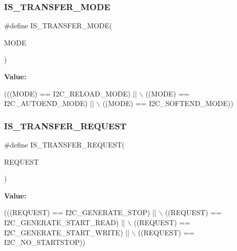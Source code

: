 \subsubsection{\texorpdfstring{I\+S\+\_\+\+T\+R\+A\+N\+S\+F\+E\+R\+\_\+\+M\+O\+DE}{IS\_TRANSFER\_MODE}}
{\footnotesize\ttfamily \#define I\+S\+\_\+\+T\+R\+A\+N\+S\+F\+E\+R\+\_\+\+M\+O\+DE(\begin{DoxyParamCaption}\item[{}]{M\+O\+DE }\end{DoxyParamCaption})}

{\bfseries Value\+:}
\begin{DoxyCode}
(((MODE) == I2C\_RELOAD\_MODE)   || \(\backslash\)
                                         ((MODE) == I2C\_AUTOEND\_MODE) || \(\backslash\)
                                         ((MODE) == I2C\_SOFTEND\_MODE))
\end{DoxyCode}
\mbox{\label{group___i2_c___private___macro_ga035522b30af949e6643a5c34bd07f9d2}} 
\subsubsection{\texorpdfstring{I\+S\+\_\+\+T\+R\+A\+N\+S\+F\+E\+R\+\_\+\+R\+E\+Q\+U\+E\+ST}{IS\_TRANSFER\_REQUEST}}
{\footnotesize\ttfamily \#define I\+S\+\_\+\+T\+R\+A\+N\+S\+F\+E\+R\+\_\+\+R\+E\+Q\+U\+E\+ST(\begin{DoxyParamCaption}\item[{}]{R\+E\+Q\+U\+E\+ST }\end{DoxyParamCaption})}

{\bfseries Value\+:}
\begin{DoxyCode}
(((REQUEST) == I2C\_GENERATE\_STOP)        || \(\backslash\)
                                         ((REQUEST) == I2C\_GENERATE\_START\_READ)  || \(\backslash\)
                                         ((REQUEST) == I2C\_GENERATE\_START\_WRITE) || \(\backslash\)
                                         ((REQUEST) == I2C\_NO\_STARTSTOP))
\end{DoxyCode}
